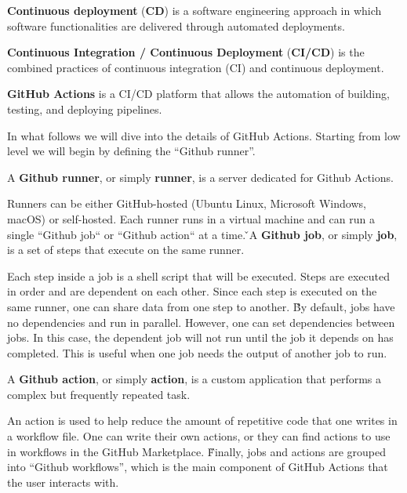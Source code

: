 \textbf{Continuous deployment} (\textbf{CD}) is a software engineering approach in which software functionalities are
delivered through automated deployments.
\ed

\textbf{Continuous Integration / Continuous Deployment} (\textbf{CI/CD}) is the combined practices of continuous
integration (CI) and continuous deployment.
\ed

\textbf{GitHub Actions} is a CI/CD platform that allows the automation of building, testing, and deploying pipelines.
\ed

In what follows we will dive into the details of GitHub Actions. Starting from low level we will begin by defining the
``Github runner''.

A \textbf{Github runner}, or simply \textbf{runner}, is a server dedicated for Github Actions.
\ed

Runners can be either GitHub-hosted (Ubuntu Linux, Microsoft Windows, macOS) or self-hosted. Each runner runs in a
virtual machine and can run a single ``Github job`` or ``Github action`` at a time. \v

A \textbf{Github job}, or simply \textbf{job}, is a set of steps that execute on the same runner.
\ed

Each step inside a job is a shell script that will be executed. Steps are executed in order and are dependent on each
other. Since each step is executed on the same runner, one can share data from one step to another. \v

By default, jobs have no dependencies and run in parallel. However, one can set dependencies between jobs. In this
case, the dependent job will not run until the job it depends on has completed. This is useful when one job needs
the output of another job to run.

A \textbf{Github action}, or simply \textbf{action}, is a custom application that performs a complex but frequently
repeated task.
\ed

An action is used to help reduce the amount of repetitive code that one writes in a workflow file. One can write their
own actions, or they can find actions to use in workflows in the GitHub Marketplace. \v

Finally, jobs and actions are grouped into ``Github workflows'', which is the main component of GitHub Actions that the
user interacts with.

